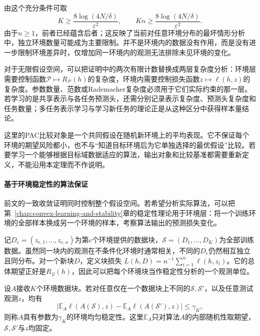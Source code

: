 由这个充分条件可取
\[
 K\geq\frac{8\log(4N/\delta)}{\varepsilon^2},\qquad
 Kn\geq\frac{8\log(4N/\delta)}{\varepsilon^2}.
\]
由于$n\geq1$，前者已经蕴含后者；这反映了当前对任意环境分布的最坏情形分析中，独立环境数量可能成为主要限制。并不是环境内的数据没有作用，而是没有进一步限制环境差异时，仅增加同一环境内的观测无法排除未见环境的变化。

对于无限假设空间，可以把证明中的两次有限计数替换成两层复杂度分析：环境层需要控制函数$\mathcal P\mapsto R_{\mathcal P}(h)$的复杂度，环境内需要控制损失函数$z\mapsto\ell(h,z)$的复杂度。参数数量、范数或Rademacher复杂度必须用于它们实际约束的那一层。若学习的是共享表示与各任务预测头，还需分别记录表示复杂度、预测头复杂度和任务数量；多任务表示学习与学习新任务的理论正是从这种区分中获得样本量结论。

这里的PAC比较对象是一个共同假设在随机新环境上的平均表现。它不保证每个环境的期望风险都小，也不与“知道目标环境后为它单独选择的最优假设”比较。若要学习一个能够根据目标域数据适应的算法，输出对象和比较基准都需要重新定义，不能沿用本定理而不作说明。

\paragraph{基于环境稳定性的算法保证}
\label{sec:dg-environment-stability}

前文的一致收敛证明同时控制整个假设空间。若希望分析实际算法，可以把第~\ref{chap:convex-learning-and-stability}章的稳定性理论用于环境层：将一个训练环境的全部样本换成另一个环境的样本，考察算法输出的预测损失变化。

记$D_e=(z_{e,1},\ldots,z_{e,n})$为第$e$个环境提供的数据块，$\mathcal S=(D_1,\ldots,D_K)$为全部训练数据。虽然同一块内的观测在不条件化环境时通常相关，不同的$D_e$仍然相互独立且同分布。对一个新块$D$，定义块损失
$L(h,D)=n^{-1}\sum_{i=1}^n\ell(h,z_i)$。它的总体期望正好是$R_{\mathcal Q}(h)$，因此可以把每个环境块当作稳定性分析的一个观测单位。

\begin{definition}[环境均匀稳定性]
\label{def:environment-stability}
设$A$接收$K$个环境数据块。若对任意仅在一个数据块上不同的$\mathcal S,\mathcal S'$，以及任意测试观测$z$，均有
\[
 \left|\mathbb E_A\ell(A(\mathcal S),z)
       -\mathbb E_A\ell(A(\mathcal S'),z)\right|\leq\gamma_K,
\]
则称$A$具有参数为$\gamma_K$的环境均匀稳定性。这里$\mathbb E_A$只对算法$A$的内部随机性取期望，$\mathcal S,\mathcal S'$与$z$均固定。
\end{definition}

